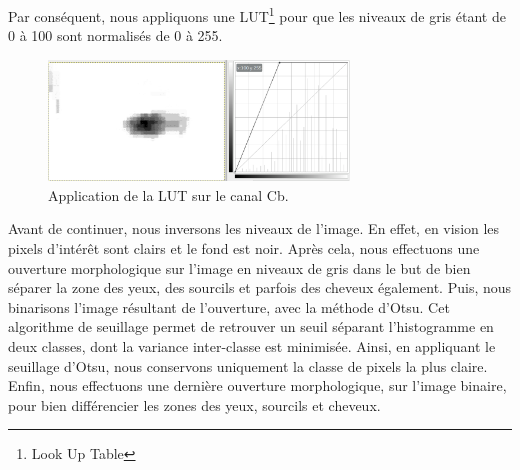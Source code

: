 Par conséquent, nous appliquons une LUT\footnote{Look Up Table} pour que les niveaux de gris étant de 0 à 100 sont normalisés de 
0 à 255.

\begin{figure}[H]
  \centering
  \includegraphics[width=8cm]{image/008/ycbcr_LUT.png}
  \caption{Application de la LUT sur le canal Cb.}
\end{figure}

Avant de continuer, nous inversons les niveaux de l'image. En effet, en vision les pixels d'intérêt sont clairs et le fond est noir.
Après cela, nous effectuons une ouverture morphologique sur l'image en niveaux de gris dans le but de 
bien séparer la zone des yeux, des sourcils et parfois des cheveux également. Puis, nous binarisons
l'image résultant de l'ouverture, avec la méthode d'Otsu\cite{OTSU_paper}. Cet algorithme de seuillage 
permet de retrouver un seuil séparant l'histogramme en deux classes, dont la variance inter-classe est 
minimisée. Ainsi, en appliquant le seuillage d'Otsu, nous conservons uniquement la classe de pixels la plus 
claire. Enfin, nous effectuons une dernière ouverture morphologique, sur l'image binaire, pour bien 
différencier les zones des yeux, sourcils et cheveux.

